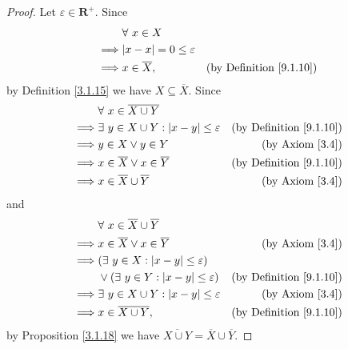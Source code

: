 \begin{proof}
    Let \(\varepsilon \in \mathbf{R}^+\).
    Since
    \begin{align*}
                 & \forall\ x \in X                                                        \\
        \implies & \abs*{x - x} = 0 \leq \varepsilon                                       \\
        \implies & x \in \overline{X},               & \text{(by Definition \ref{9.1.10})}
    \end{align*}
    by Definition \ref{3.1.15} we have \(X \subseteq \overline{X}\).
    Since
    \begin{align*}
                 & \forall\ x \in \overline{X \cup Y}                                                            \\
        \implies & \exists\ y \in X \cup Y : \abs*{x - y} \leq \varepsilon & \text{(by Definition \ref{9.1.10})} \\
        \implies & y \in X \lor y \in Y                                    & \text{(by Axiom \ref{3.4})}         \\
        \implies & x \in \overline{X} \lor x \in \overline{Y}              & \text{(by Definition \ref{9.1.10})} \\
        \implies & x \in \overline{X} \cup \overline{Y}                    & \text{(by Axiom \ref{3.4})}
    \end{align*}
    and
    \begin{align*}
                 & \forall\ x \in \overline{X} \cup \overline{Y}                                                 \\
        \implies & x \in \overline{X} \lor x \in \overline{Y}              & \text{(by Axiom \ref{3.4})}         \\
        \implies & (\exists\ y \in X : \abs*{x - y} \leq \varepsilon)                                            \\
                 & \lor (\exists\ y \in Y : \abs*{x - y} \leq \varepsilon) & \text{(by Definition \ref{9.1.10})} \\
        \implies & \exists\ y \in X \cup Y : \abs*{x - y} \leq \varepsilon & \text{(by Axiom \ref{3.4})}         \\
        \implies & x \in \overline{X \cup Y},                              & \text{(by Definition \ref{9.1.10})}
    \end{align*}
    by Proposition \ref{3.1.18} we have \(\overline{X \cup Y} = \overline{X} \cup \overline{Y}\).

\end{proof}
